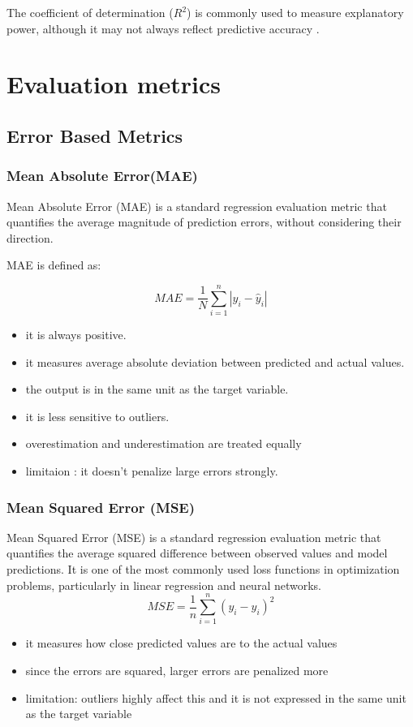\documentclass{article}
\begin{document}
The coefficient of determination ($R^2$) is commonly used to measure explanatory power, although it may not always reflect predictive accuracy \cite{chicco2021}.
\section{Evaluation metrics}
\subsection{Error Based Metrics}

    \subsubsection{ Mean Absolute Error(MAE)}
    Mean Absolute Error (MAE) is a standard regression evaluation metric that quantifies the average magnitude of prediction errors, without considering their direction.

    MAE is defined as:

    \begin{equation}
        MAE = \frac{1}{N}\sum_{i=1}^{n} \left| y_i - \hat{y}_i \right|
    \end{equation}
    \begin{itemize}
    \item it is always positive.
    \item  it measures  average absolute deviation between predicted and actual values.
    \item the output is in the same unit as the target variable.
    \item it is less sensitive to outliers.
    \item overestimation and underestimation are treated equally
    \item limitaion : it doesn't penalize large errors strongly.
\end{itemize}

\subsubsection{Mean Squared Error (MSE)}
    Mean Squared Error (MSE) is a standard regression evaluation metric that quantifies the average squared difference between observed values and model predictions. It is one of the most commonly used loss functions in optimization problems, particularly in linear regression and neural networks.
    \begin{equation}
        MSE = \frac{1}{n} \sum_{i=1}^{n} \left( y_i - \hat{y}_i \right)^2
    \end{equation}
    \begin{itemize}
        \item it measures how close predicted values are to the actual values
        \item since the errors are squared,
        larger errors are penalized more 
        \item limitation: outliers highly affect this and it is  not expressed in the same unit as the target variable
            
    \end{itemize}
\end{document}
